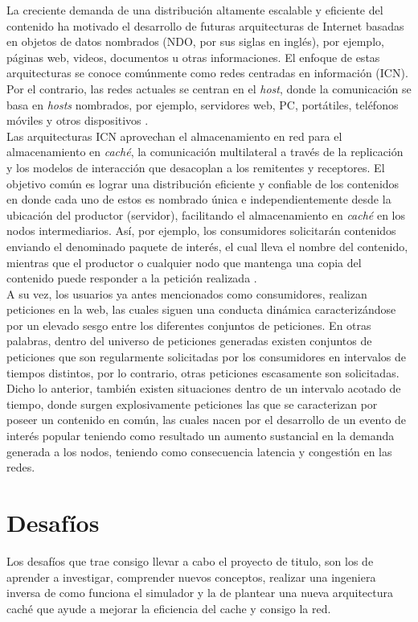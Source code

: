 \documentclass[12pt]{ociamthesis}  %
\begin{document}
La creciente demanda de una distribución altamente escalable y eficiente del contenido ha motivado el desarrollo de futuras arquitecturas de Internet basadas en objetos de datos nombrados (NDO, por sus siglas en inglés), por ejemplo, páginas web, videos, documentos u otras informaciones. El enfoque de estas arquitecturas se conoce comúnmente como redes centradas en información (ICN). Por el contrario, las redes actuales se centran en el \textit{host}, donde la comunicación se basa en \textit{hosts} nombrados, por ejemplo, servidores web, PC, portátiles, teléfonos móviles y otros dispositivos \cite{ahlgren2012survey}.\\

Las arquitecturas ICN aprovechan el almacenamiento en red para el almacenamiento en \textit{caché}, la comunicación multilateral a través de la replicación y los modelos de interacción que desacoplan a los remitentes y receptores. El objetivo común es lograr una distribución eficiente y confiable de los contenidos en donde cada uno de estos es nombrado única e independientemente desde la ubicación del productor (servidor), facilitando el almacenamiento en \textit{caché} en los nodos intermediarios. Así, por ejemplo, los consumidores solicitarán contenidos enviando el denominado paquete de interés, el cual lleva el nombre del contenido, mientras que el productor o cualquier nodo que mantenga una copia del contenido puede responder a la petición realizada \cite{ahlgren2012survey}.\\

A su vez, los usuarios ya antes mencionados como consumidores, realizan peticiones en la web, las cuales siguen una conducta dinámica caracterizándose por un elevado sesgo entre los diferentes conjuntos de peticiones. En otras palabras, dentro del universo de peticiones generadas existen conjuntos de peticiones que son regularmente solicitadas por los consumidores en intervalos de tiempos distintos, por lo contrario, otras peticiones escasamente son solicitadas. Dicho lo anterior, también existen situaciones dentro de un intervalo acotado de tiempo, donde surgen explosivamente peticiones las que se caracterizan por poseer un contenido en común, las cuales nacen por el desarrollo de un evento de interés popular teniendo como resultado un aumento sustancial en la demanda generada a los nodos, teniendo como consecuencia latencia y congestión en las redes.


\section{Desafíos}
Los desafíos que trae consigo llevar a cabo el proyecto de titulo, son los de aprender a investigar, comprender nuevos conceptos, realizar una ingeniera inversa de como funciona el simulador y la de plantear una nueva arquitectura caché que ayude a mejorar la eficiencia del cache y consigo la red.
\end{document}
